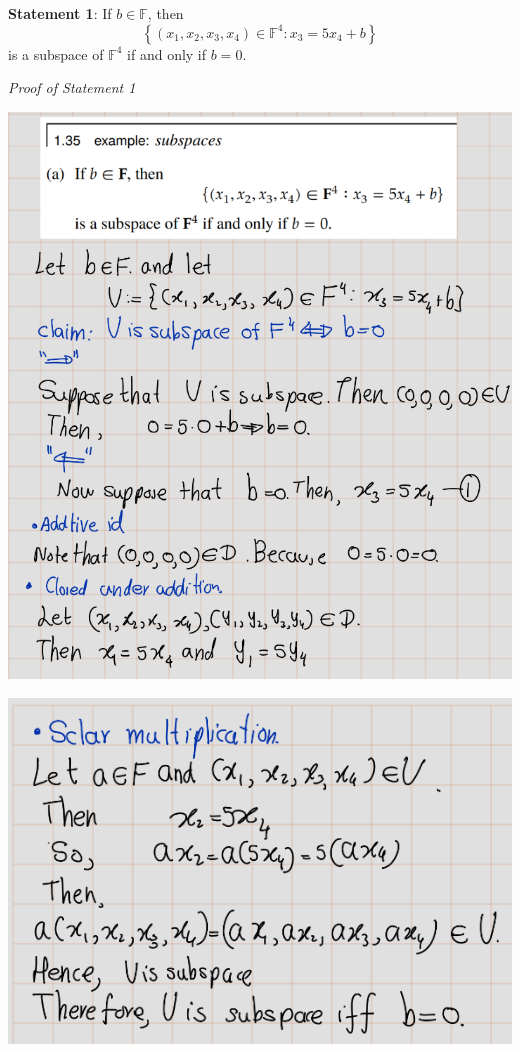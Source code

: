 \documentclass[
]{book}
\theoremstyle{definition}
\theoremstyle{definition}
\theoremstyle{definition}
\theoremstyle{definition}
\theoremstyle{remark}
\begin{document}
\textbf{Statement 1}: If \(b\in \mathbb{F}\), then
\[\left\{(x_1,x_2,x_3,x_4)\in \mathbb{F}^4:x_3=5x_4+b\right\}\]
is a subspace of \(\mathbb{F}^4\) if and only if \(b = 0\).

\emph{Proof of Statement 1}

\includegraphics{fig/Ex1C/Ex2-a-1.png}

\includegraphics{fig/Ex1C/Ex2-a-2.png}
\end{document}

